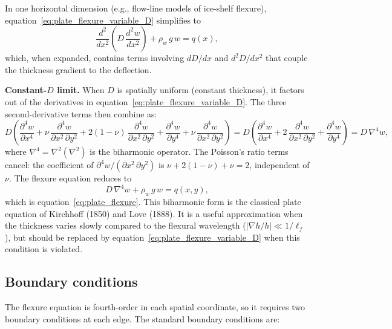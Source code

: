 \documentclass[11pt]{article}
\begin{document}
\medskip
\noindent In one horizontal dimension (e.g., flow-line models of ice-shelf flexure), equation~\eqref{eq:plate_flexure_variable_D} simplifies to
\begin{equation}
  \frac{d^2}{dx^2}\!\left(D\,\frac{d^2 w}{dx^2}\right) + \rho_w\,g\,w = q(x),
  \label{eq:beam_flexure_variable_D}
\end{equation}
which, when expanded, contains terms involving $dD/dx$ and $d^2D/dx^2$ that couple the thickness gradient to the deflection.

\medskip
\noindent\textbf{Constant-$D$ limit.}  When $D$ is spatially uniform (constant thickness), it factors out of the derivatives in equation~\eqref{eq:plate_flexure_variable_D}.  The three second-derivative terms then combine as:
\begin{equation}
  D\!\left(\frac{\partial^4 w}{\partial x^4} + \nu\,\frac{\partial^4 w}{\partial x^2\,\partial y^2} + 2(1-\nu)\,\frac{\partial^4 w}{\partial x^2\,\partial y^2} + \frac{\partial^4 w}{\partial y^4} + \nu\,\frac{\partial^4 w}{\partial x^2\,\partial y^2}\right) = D\!\left(\frac{\partial^4 w}{\partial x^4} + 2\,\frac{\partial^4 w}{\partial x^2\,\partial y^2} + \frac{\partial^4 w}{\partial y^4}\right) = D\,\nabla^4 w,
\end{equation}
where $\nabla^4 = \nabla^2(\nabla^2)$ is the biharmonic operator.  The Poisson's ratio terms cancel: the coefficient of $\partial^4 w/(\partial x^2\,\partial y^2)$ is $\nu + 2(1-\nu) + \nu = 2$, independent of $\nu$.  The flexure equation reduces to
\begin{equation}
  \boxed{D\,\nabla^4 w + \rho_w\,g\,w = q(x,y),}
  \label{eq:plate_flexure_derived}
\end{equation}
which is equation~\eqref{eq:plate_flexure}.  This biharmonic form is the classical plate equation of Kirchhoff (1850) and Love (1888).  It is a useful approximation when the thickness varies slowly compared to the flexural wavelength ($|\nabla h / h| \ll 1/\ell_f$), but should be replaced by equation~\eqref{eq:plate_flexure_variable_D} when this condition is violated.

\subsection*{Boundary conditions}

The flexure equation is fourth-order in each spatial coordinate, so it requires two boundary conditions at each edge.  The standard boundary conditions are:
\end{document}
